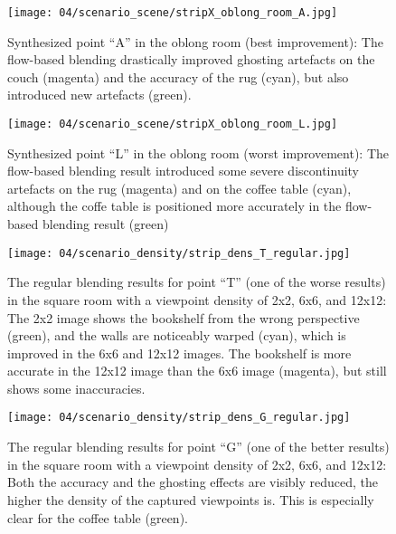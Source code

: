 \begin{figure}
  \centering
  \texttt{[image: 04/scenario\_scene/stripX\_oblong\_room\_A.jpg]}
  \caption[Viewpoint ``A'' in the oblong room]{Synthesized point ``A'' in the oblong room (best improvement): The flow-based blending drastically improved ghosting artefacts on the couch (magenta) and the accuracy of the rug (cyan), but also introduced new artefacts (green).}
  \label{fig:scene_oblong_A}
\end{figure}

\begin{figure}
  \centering
  \texttt{[image: 04/scenario\_scene/stripX\_oblong\_room\_L.jpg]}
  \caption[Viewpoint ``L'' in the oblong room]{Synthesized point ``L'' in the oblong room (worst improvement): The flow-based blending result introduced some severe discontinuity artefacts on the rug (magenta) and on the coffee table (cyan), although the coffe table is positioned more accurately in the flow-based blending result (green)}
  \label{fig:scene_oblong_L}
\end{figure}


\begin{figure}
		\centering
    \texttt{[image: 04/scenario\_density/strip\_dens\_T\_regular.jpg]}
		\caption[Regular blending results for viewpoint ``T'' with different densities]{The regular blending results for point ``T'' (one of the worse results) in the square room with a viewpoint density of 2x2, 6x6, and 12x12: The 2x2 image shows the bookshelf from the wrong perspective (green), and the walls are noticeably warped (cyan), which is improved in the 6x6 and 12x12 images. The bookshelf is more accurate in the 12x12 image than the 6x6 image (magenta), but still shows some inaccuracies.}
		\label{fig:density_regular_T}
\end{figure}

\begin{figure}
		\centering
    \texttt{[image: 04/scenario\_density/strip\_dens\_G\_regular.jpg]}
		\caption[Regular blending results for viewpoint ``G'' with different densities] {The regular blending results for point ``G'' (one of the better results) in the square room with a viewpoint density of 2x2, 6x6, and 12x12: Both the accuracy and the ghosting effects are visibly reduced, the higher the density of the captured viewpoints is. This is especially clear for the coffee table (green).}
		\label{fig:density_regular_G}
\end{figure}

